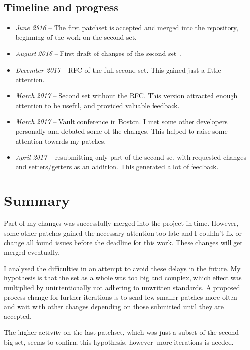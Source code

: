 \subsection{Timeline and progress}

\begin{itemize}
	\item {\em June 2016} -- The first patchset is accepted and merged into
		the repository, beginning of the work on the second set.
	\item {\em August 2016} -- First draft of changes of the second set~\cite{secondSetPreRFC}.
	\item {\em December 2016} -- RFC of the full second set. This gained just a little attention.
	\item {\em March 2017} -- Second set without the RFC. This version attracted enough attention to be useful, and provided valuable feedback.
	\item {\em March 2017} -- Vault conference in Boston. I met some other developers personally and debated some of the changes. This helped to raise some attention towards my patches.
	\item {\em April 2017} -- resubmitting only part of the second set with requested changes and setters/getters as an addition. This generated a lot of feedback.
\end{itemize}


\section{Summary}\label{chap:refactoring:summary}

Part of my changes was successfully merged into the project in time. However,
some other patches gained the necessary attention too late and I couldn't fix
or change all found issues before the deadline for this work. These changes
will get merged eventually.

I analysed the difficulties in an attempt to avoid these delays in the future.
My hypothesis is that the set as a whole was too big and complex, which effect
was multiplied by unintentionally not adhering to unwritten standards. A
proposed process change for further iterations is to send few smaller patches
more often and wait with other changes depending on those submitted until they
are accepted.

The higher activity on the last patchset, which was just a subset of the second
big set, seems to confirm this hypothesis, however, more iterations is needed.

